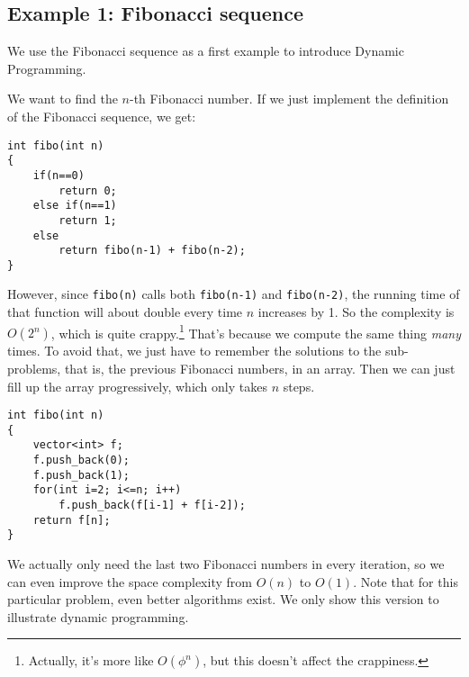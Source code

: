 \subsection{Example 1: Fibonacci sequence}
We use the Fibonacci sequence as a first example to introduce Dynamic Programming. 

We want to find the $n$-th Fibonacci number.
If we just implement the definition of the Fibonacci sequence, we get:
\begin{verbatim}
int fibo(int n)
{
    if(n==0)
        return 0;
    else if(n==1)
        return 1;
    else
        return fibo(n-1) + fibo(n-2);
}
\end{verbatim}
However, since \texttt{fibo(n)} calls both \texttt{fibo(n-1)} and
\texttt{fibo(n-2)}, the running time of that function will about double
every time $n$ increases by 1.
So the complexity is $O(2^n)$, which is quite crappy.\footnote{Actually, it's more like $O(\phi^n)$, but this doesn't affect the crappiness.}
That's because we compute the same thing \emph{many} times.
To avoid that, we just have to remember the solutions to the sub-problems,
that is, the previous Fibonacci numbers, in an array.
Then we can just fill up the array progressively, which only takes $n$ steps.
\begin{verbatim}
int fibo(int n)
{
    vector<int> f;
    f.push_back(0);
    f.push_back(1);
    for(int i=2; i<=n; i++)
        f.push_back(f[i-1] + f[i-2]);
    return f[n];
}
\end{verbatim}

We actually only need the last two Fibonacci numbers in every iteration, so we can even improve the space complexity from $O(n)$ to $O(1)$.
Note that for this particular problem, even better algorithms exist. We only show this version to illustrate dynamic programming.


